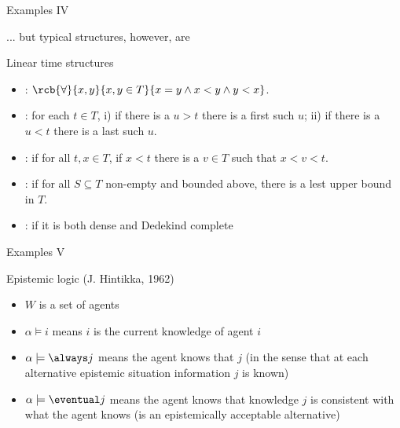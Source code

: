 \documentclass{beamer}
\begin{document}
\begin{slide}{Examples IV}\label{s:18b}
\small

... but typical structures, however, are 

\begin{block}{Linear time structures}
\begin{itemize}
\item {}: $\rcb{\forall}{x,y}{x,y \in T}{x=y \wedge x<y \wedge y<x}$.
\item {}: for each $t\in T$, i) if there is a $u>t$ there is a first such $u$; ii) if there is a $u<t$ there is a last such $u$.
\item {}: if for all $t,x \in T$, if $x<t$ there is a $v\in T$ such that $x<v<t$.
\item {}: if for all $S\subseteq T$ non-empty and bounded above, there is a lest upper bound in $T$.
\item {}: if it is both dense and Dedekind complete
\end{itemize}
\end{block}
\end{slide}





\begin{slide}{Examples V}\label{s:19}
\small
\begin{block}{Epistemic logic (J. Hintikka, 1962)}
\begin{itemize}
\item $W$ is a set of agents 
\item $\alpha \models i$ means $i$ is the current knowledge of agent $i$
\item $\alpha \models \always j$ means the agent knows that $j$ (in the sense that at each alternative epistemic situation information $j$ is known) 
\item $\alpha \models \eventual j$ means the agent knows that  knowledge $j$ is consistent with what the agent knows (is an epistemically acceptable alternative)
\end{itemize}
\end{block}
\end{slide}
\end{document}
